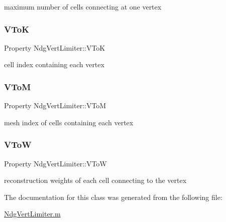 maximum number of cells connecting at one vertex 

\mbox{\label{class_ndg_vert_limiter_a6e7c806e168430bdc34042a6447069a6}} 
\subsubsection{\texorpdfstring{V\+ToK}{VToK}}
{\footnotesize\ttfamily Property Ndg\+Vert\+Limiter\+::\+V\+ToK\hspace{0.3cm}{\ttfamily [protected]}}



cell index containing each vertex 

\mbox{\label{class_ndg_vert_limiter_ab6a73029baf74d7a4ccce2747bc6c958}} 
\subsubsection{\texorpdfstring{V\+ToM}{VToM}}
{\footnotesize\ttfamily Property Ndg\+Vert\+Limiter\+::\+V\+ToM\hspace{0.3cm}{\ttfamily [protected]}}



mesh index of cells containing each vertex 

\mbox{\label{class_ndg_vert_limiter_a771cef5e7edb7ea0fb5a6634dbe5f4d8}} 
\subsubsection{\texorpdfstring{V\+ToW}{VToW}}
{\footnotesize\ttfamily Property Ndg\+Vert\+Limiter\+::\+V\+ToW\hspace{0.3cm}{\ttfamily [protected]}}



reconstruction weights of each cell connecting to the vertex 



The documentation for this class was generated from the following file\+:\begin{DoxyCompactItemize}
\item 
\hyperlink{_ndg_vert_limiter_8m}{Ndg\+Vert\+Limiter.\+m}\end{DoxyCompactItemize}
